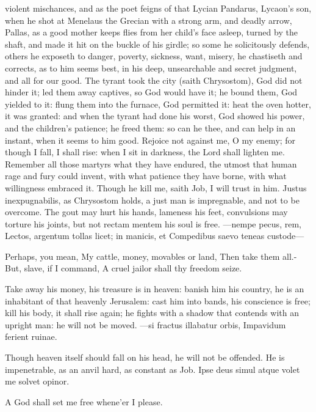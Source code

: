{violent mischances, and as the poet feigns of that Lycian
Pandarus, Lycaon's son, when he shot at Menelaus the Grecian with a
strong arm, and deadly arrow, Pallas, as a good mother keeps flies from
her child's face asleep, turned by the shaft, and made it hit on the
buckle of his girdle; so some he solicitously defends, others he
exposeth to danger, poverty, sickness, want, misery, he chastiseth and
corrects, as to him seems best, in his deep, unsearchable and secret
judgment, and all for our good. The tyrant took the city (saith
Chrysostom), God did not hinder it; led them away captives, so
God would have it; he bound them, God yielded to it: flung them into
the furnace, God permitted it: heat the oven hotter, it was granted:
and when the tyrant had done his worst, God showed his power, and the
children's patience; he freed them: so can he thee, and can help
in an instant, when it seems to him good.  Rejoice not against
me, O my enemy; for though I fall, I shall rise: when I sit in
darkness, the Lord shall lighten me. Remember all those martyrs what
they have endured, the utmost that human rage and fury could invent,
with what patience they have borne, with what willingness
embraced it. Though he kill me, saith Job, I will trust in him. Justus
inexpugnabilis, as Chrysostom holds, a just man is impregnable,
and not to be overcome. The gout may hurt his hands, lameness his feet,
convulsions may torture his joints, but not rectam mentem his soul is
free.
---nempe pecus, rem,
Lectos, argentum tollas licet; in manicis, et
Compedibus saevo teneas custode---

Perhaps, you mean,
My cattle, money, movables or land,
Then take them all.-But, slave, if I command,
A cruel jailor shall thy freedom seize.

Take away his money, his treasure is in heaven: banish him his
country, he is an inhabitant of that heavenly Jerusalem: cast him into
bands, his conscience is free; kill his body, it shall rise again; he
fights with a shadow that contends with an upright man: he will not be
moved.
---si fractus illabatur orbis,
Impavidum ferient ruinae.

Though heaven itself should fall on his head, he will not be offended.
He is impenetrable, as an anvil hard, as constant as Job.
Ipse deus simul atque volet me solvet opinor.

A God shall set me free whene'er I please.

}
